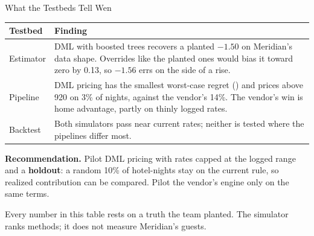 \documentclass[aspectratio=169, 11pt, handout]{beamer}
\begin{document}
\begin{frame}{What the Testbeds Tell Wen}

\begin{center}
\small
\begin{tabular}{p{3.3cm}p{9.4cm}}
\toprule
\textbf{Testbed} & \textbf{Finding} \\
\midrule
Estimator & DML with boosted trees recovers a planted $-1.50$ on Meridian's data shape. Overrides like the planted ones would bias it toward zero by 0.13, so $-1.56$ errs on the side of a rise. \\[0.3em]
Pipeline & DML pricing has the smallest worst-case regret (\textyen 760) and prices above \textyen 1{,}920 on 3\% of nights, against the vendor's 14\%. The vendor's win is home advantage, partly on thinly logged rates. \\[0.3em]
Backtest & Both simulators pass near current rates; neither is tested where the pipelines differ most. \\
\bottomrule
\end{tabular}
\end{center}

\medskip

\textbf{Recommendation.} Pilot DML pricing with rates capped at the logged range and a \textbf{holdout}: a random 10\% of hotel-nights stay on the current rule, so realized contribution can be compared. Pilot the vendor's engine only on the same terms.

\medskip

Every number in this table rests on a truth the team planted. The simulator ranks methods; it does not measure Meridian's guests.
\end{frame}
\end{document}
